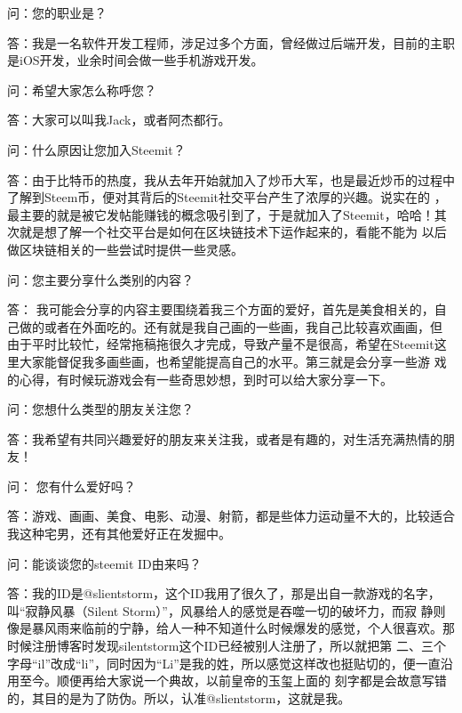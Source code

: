 \documentclass[]{ctexbook}
\begin{document}
问：您的职业是？

答：我是一名软件开发工程师，涉足过多个方面，曾经做过后端开发，目前的主职是iOS开发，业余时间会做一些手机游戏开发。

问：希望大家怎么称呼您？

答：大家可以叫我Jack，或者阿杰都行。

问：什么原因让您加入Steemit？

答：由于比特币的热度，我从去年开始就加入了炒币大军，也是最近炒币的过程中了解到Steem币，便对其背后的Steemit社交平台产生了浓厚的兴趣。说实在的 ，最主要的就是被它发帖能赚钱的概念吸引到了，于是就加入了Steemit，哈哈！其次就是想了解一个社交平台是如何在区块链技术下运作起来的，看能不能为 以后做区块链相关的一些尝试时提供一些灵感。

问：您主要分享什么类别的内容？

答： 我可能会分享的内容主要围绕着我三个方面的爱好，首先是美食相关的，自己做的或者在外面吃的。还有就是我自己画的一些画，我自己比较喜欢画画，但 由于平时比较忙，经常拖稿拖很久才完成，导致产量不是很高，希望在Steemit这里大家能督促我多画些画，也希望能提高自己的水平。第三就是会分享一些游 戏的心得，有时候玩游戏会有一些奇思妙想，到时可以给大家分享一下。

问：您想什么类型的朋友关注您？

答：我希望有共同兴趣爱好的朋友来关注我，或者是有趣的，对生活充满热情的朋友！

问： 您有什么爱好吗？

答：游戏、画画、美食、电影、动漫、射箭，都是些体力运动量不大的，比较适合我这种宅男，还有其他爱好正在发掘中。

问：能谈谈您的steemit ID由来吗？

答：我的ID是@slientstorm，这个ID我用了很久了，那是出自一款游戏的名字，叫``寂静风暴（Silent Storm）''，风暴给人的感觉是吞噬一切的破坏力，而寂 静则像是暴风雨来临前的宁静，给人一种不知道什么时候爆发的感觉，个人很喜欢。那时候注册博客时发现silentstorm这个ID已经被别人注册了，所以就把第 二、三个字母``il''改成``li''，同时因为``Li''是我的姓，所以感觉这样改也挺贴切的，便一直沿用至今。顺便再给大家说一个典故，以前皇帝的玉玺上面的 刻字都是会故意写错的，其目的是为了防伪。所以，认准@slientstorm，这就是我。
\end{document}
